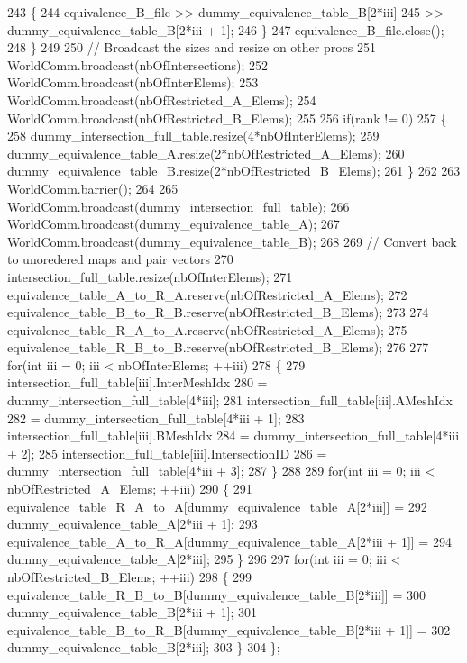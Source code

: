 \begin{DoxyCode}
243         \{
244             equivalence\_B\_file  >> dummy\_equivalence\_table\_B[2*iii]
245                                 >> dummy\_equivalence\_table\_B[2*iii + 1];
246         \}
247         equivalence\_B\_file.close();
248     \}
249 
250     \textcolor{comment}{// Broadcast the sizes and resize on other procs}
251     WorldComm.broadcast(nbOfIntersections);
252     WorldComm.broadcast(nbOfInterElems);
253     WorldComm.broadcast(nbOfRestricted\_A\_Elems);
254     WorldComm.broadcast(nbOfRestricted\_B\_Elems);
255 
256     \textcolor{keywordflow}{if}(rank != 0)
257     \{
258         dummy\_intersection\_full\_table.resize(4*nbOfInterElems);
259         dummy\_equivalence\_table\_A.resize(2*nbOfRestricted\_A\_Elems);
260         dummy\_equivalence\_table\_B.resize(2*nbOfRestricted\_B\_Elems);
261     \}
262 
263     WorldComm.barrier();
264 
265     WorldComm.broadcast(dummy\_intersection\_full\_table);
266     WorldComm.broadcast(dummy\_equivalence\_table\_A);
267     WorldComm.broadcast(dummy\_equivalence\_table\_B);
268 
269     \textcolor{comment}{// Convert back to unoredered maps and pair vectors}
270     intersection\_full\_table.resize(nbOfInterElems);
271     equivalence\_table\_A\_to\_R\_A.reserve(nbOfRestricted\_A\_Elems);
272     equivalence\_table\_B\_to\_R\_B.reserve(nbOfRestricted\_B\_Elems);
273 
274     equivalence\_table\_R\_A\_to\_A.reserve(nbOfRestricted\_A\_Elems);
275     equivalence\_table\_R\_B\_to\_B.reserve(nbOfRestricted\_B\_Elems);
276 
277     \textcolor{keywordflow}{for}(\textcolor{keywordtype}{int} iii = 0; iii < nbOfInterElems; ++iii)
278     \{
279         intersection\_full\_table[iii].InterMeshIdx
280                                     = dummy\_intersection\_full\_table[4*iii];
281         intersection\_full\_table[iii].AMeshIdx
282                                     = dummy\_intersection\_full\_table[4*iii + 1];
283         intersection\_full\_table[iii].BMeshIdx
284                                     = dummy\_intersection\_full\_table[4*iii + 2];
285         intersection\_full\_table[iii].IntersectionID
286                                     = dummy\_intersection\_full\_table[4*iii + 3];
287     \}
288 
289     \textcolor{keywordflow}{for}(\textcolor{keywordtype}{int} iii = 0; iii < nbOfRestricted\_A\_Elems; ++iii)
290     \{
291         equivalence\_table\_R\_A\_to\_A[dummy\_equivalence\_table\_A[2*iii]] =
292                 dummy\_equivalence\_table\_A[2*iii + 1];
293         equivalence\_table\_A\_to\_R\_A[dummy\_equivalence\_table\_A[2*iii + 1]] =
294                 dummy\_equivalence\_table\_A[2*iii];
295     \}
296 
297     \textcolor{keywordflow}{for}(\textcolor{keywordtype}{int} iii = 0; iii < nbOfRestricted\_B\_Elems; ++iii)
298     \{
299         equivalence\_table\_R\_B\_to\_B[dummy\_equivalence\_table\_B[2*iii]] =
300                 dummy\_equivalence\_table\_B[2*iii + 1];
301         equivalence\_table\_B\_to\_R\_B[dummy\_equivalence\_table\_B[2*iii + 1]] =
302                 dummy\_equivalence\_table\_B[2*iii];
303     \}
304 \};
\end{DoxyCode}
\hypertarget{namespacecarl_a2a42a81e2c9cc6e97c90f5960e5f1048}{}
